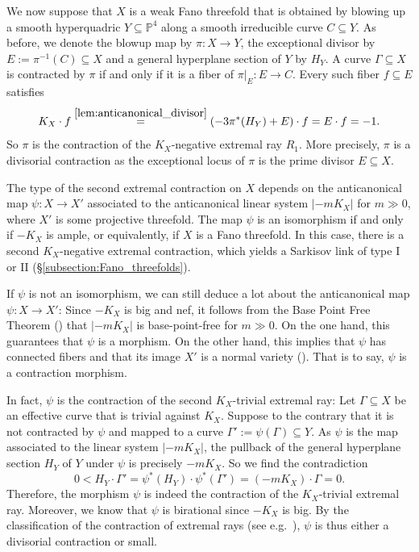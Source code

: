 \documentclass[english,11pt,reqno]{amsart}
\newcommand{\sub}{\subseteq}
\newcommand{\Pfour}{\mathbb{P}^4}
\begin{document}
We now suppose that $X$ is a weak Fano threefold that is obtained by blowing up a smooth hyperquadric $Y\sub \Pfour$ along a smooth irreducible curve $C\sub Y$. As before, we denote the blowup map by $\pi:X\rightarrow Y$, the exceptional divisor by $E:=\pi^{-1}(C)\sub X$ and a general hyperplane section of $Y$ by $H_Y$. A curve $\Gamma \sub X$ is contracted by $\pi$ if and only if it is a fiber of $\pi|_E:E\rightarrow C$. Every such fiber $f\sub E$ satisfies 
$$K_X\cdot f\overset{\ref{lem:anticanonical_divisor}}{=}(-3\pi^*(H_Y)+E)\cdot f=E\cdot f=-1.$$
So $\pi$ is the contraction of the $K_X$-negative extremal ray $R_1$. More precisely, $\pi$ is a divisorial contraction as the exceptional locus of $\pi$ is the prime divisor $E\sub X$. \par 
The type of the second extremal contraction on $X$ depends on the anticanonical map $\psi:X\rightarrow X'$ associated to the anticanonical linear system $|-mK_X|$ for $m\gg0$, where $X'$ is some projective threefold. The map $\psi$ is an isomorphism if and only if $-K_X$ is ample, or equivalently, if $X$ is a Fano threefold. In this case, there is a second $K_X$-negative extremal contraction, which yields a Sarkisov link of type I or II (\S \ref{subsection:Fano_threefolds}). \par 
If $\psi$ is not an isomorphism, we can still deduce a lot about the anticanonical map $\psi:X\rightarrow X'$: Since $-K_X$ is big and nef, it follows from the Base Point Free Theorem (\cite[Thm.\ 1.3.6]{Shafarevich_Parshin_AlgGeom_Fano_varieties}) that $|-mK_X|$ is base-point-free for $m\gg0$. On the one hand, this guarantees that $\psi$ is a morphism. On the other hand, this implies that $\psi$ has connected fibers and that its image $X'$ is a normal variety (\cite[Prop.\ 7.6(b)]{Debarre-Higher_dimensional_Alg_Geom}). That is to say, $\psi$ is a contraction morphism. \par 
In fact, $\psi$ is the contraction of the second $K_X$-trivial extremal ray: Let $\Gamma \sub X$ be an effective curve that is trivial against $K_X$. Suppose to the contrary that it is not contracted by $\psi$ and mapped to a curve $\Gamma':=\psi(\Gamma) \sub Y$. As $\psi$ is the map associated to the linear system $|-mK_X|$, the pullback of the general hyperplane section $H_Y$ of $Y$ under $\psi$ is precisely $-mK_X$. So we find the contradiction $$0<H_Y\cdot \Gamma' =\psi^*(H_Y)\cdot \psi^*(\Gamma') = (-mK_X) \cdot \Gamma =0.$$ 
Therefore, the morphism $\psi$ is indeed the contraction of the $K_X$-trivial extremal ray. Moreover, we know that $\psi$ is birational  since $-K_X$ is big. By the classification of the contraction of extremal rays (see e.g.\ \cite[Prop.\ 2.5]{Mori_Kollar_Birational_geometry}), $\psi$ is thus either a divisorial contraction or small. \par 
\end{document}

